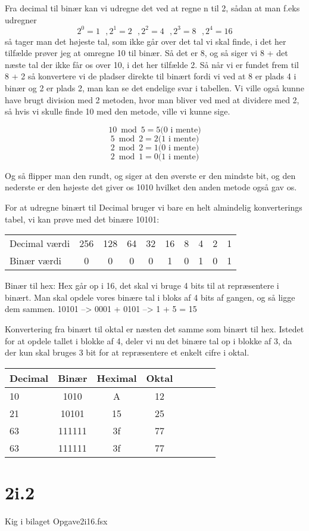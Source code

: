 \documentclass[12pt, a4paper, hidelinks]{article}
\begin{document}
Fra decimal til binær kan vi udregne det ved at regne n til 2, sådan at man f.eks udregner $$ 2^0 = 1 \text{ }, 2^1 = 2 \text{ }, 2^2 = 4 \text{ },   2^3 = 8 \text{ },   2^4 = 16 $$
så tager man det højeste tal, som ikke går over det tal vi skal finde,
i det her tilfælde prøver jeg at omregne 10 til binær. 
Så det er 8, og så siger vi 8 + det næste tal der ikke får os over 10, i det her tilfælde 2. Så når vi er fundet frem til 8 + 2 så konvertere vi de pladser direkte til binært fordi vi ved at 8 er plads 4 i binær og 2 er plads 2, man kan se det endelige svar i tabellen.
Vi ville også kunne have brugt division med 2 metoden, hvor man bliver ved med at dividere med 2, så hvis vi skulle finde 10 med den metode, ville vi kunne sige.

$$ 10 \bmod 5  = 5 \text{(0 i mente)} $$
$$ 5 \bmod 2 = 2 \text{(1 i mente)} $$
$$ 2 \bmod 2  = 1 \text{(0 i mente)} $$
$$ 2 \bmod 1 = 0 \text{(1 i mente)} $$

Og så flipper man den rundt, og siger at den øverste er den mindste bit, og den nederste er den  højeste det giver os 1010 hvilket den anden metode også gav os.

For at udregne binært til Decimal bruger vi bare en helt almindelig konverterings tabel, vi kan prøve med det binære 10101:

\begin{tabular}{l*{8}{c}r}
Decimal værdi & 256 & 128 & 64 & 32 & 16 & 8 & 4 & 2 & 1 \\
Binær værdi   & 0   & 0   &  0 &  0 &  1 & 0 & 1 & 0 & 1  \\
\end{tabular}


Binær til hex:
Hex går op i 16, det skal vi bruge 4 bits til at repræsentere i binært. Man skal opdele vores binære tal i bloks af 4 bits af gangen, og så ligge dem sammen. 
10101  -->  0001 + 0101  --> 1 + 5 = 15

Konvertering fra binært til oktal er næsten det samme som binært til hex. Istedet for at opdele tallet i blokke af 4, deler vi nu det binære tal op i blokke af 3, da der kun skal bruges 3 bit for at repræsentere et enkelt cifre i oktal.

\begin{tabular}{l*{6}{c}r}
Decimal & Binær & Heximal & Oktal \\
\hline
10 & 1010  & A & 12\\
21 & 10101 & 15 & 25 \\
63 & 111111 & 3f & 77 \\
63 & 111111 & 3f & 77 \\
\end{tabular}

\section{2i.2}
Kig i bilaget Opgave2i16.fsx
\end{document}
